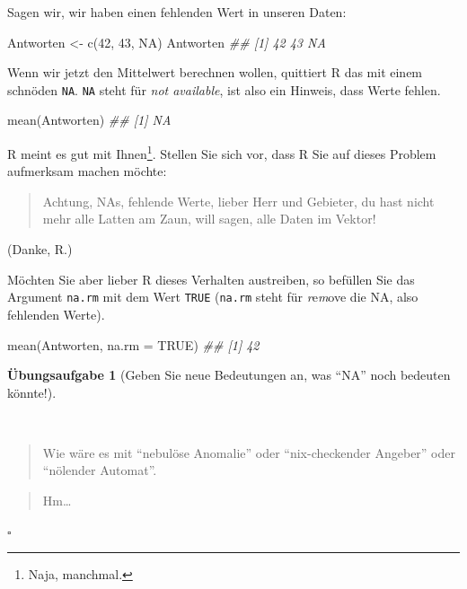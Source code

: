 \documentclass[
  letterpaper,
]{scrbook}
\newenvironment{Shaded}{\begin{snugshade}}{\end{snugshade}}
\newcommand{\AttributeTok}[1]{\textcolor[rgb]{0.40,0.45,0.13}{#1}}
\newcommand{\ConstantTok}[1]{\textcolor[rgb]{0.56,0.35,0.01}{#1}}
\newcommand{\DecValTok}[1]{\textcolor[rgb]{0.68,0.00,0.00}{#1}}
\newcommand{\DocumentationTok}[1]{\textcolor[rgb]{0.37,0.37,0.37}{\textit{#1}}}
\newcommand{\FunctionTok}[1]{\textcolor[rgb]{0.28,0.35,0.67}{#1}}
\newcommand{\NormalTok}[1]{\textcolor[rgb]{0.00,0.23,0.31}{#1}}
\newcommand{\OtherTok}[1]{\textcolor[rgb]{0.00,0.23,0.31}{#1}}
\theoremstyle{definition}
\theoremstyle{definition}
\theoremstyle{definition}
\newtheorem{exercise}{Übungsaufgabe}[chapter]
\theoremstyle{remark}
\begin{document}
Sagen wir, wir haben einen fehlenden Wert in unseren Daten:

\begin{Shaded}
\begin{Highlighting}[]
\NormalTok{Antworten }\OtherTok{\textless{}{-}} \FunctionTok{c}\NormalTok{(}\DecValTok{42}\NormalTok{, }\DecValTok{43}\NormalTok{, }\ConstantTok{NA}\NormalTok{)}
\NormalTok{Antworten}
\DocumentationTok{\#\# [1] 42 43 NA}
\end{Highlighting}
\end{Shaded}

Wenn wir jetzt den Mittelwert berechnen wollen, quittiert R das mit
einem schnöden \texttt{NA}. \texttt{NA} steht für \emph{not available},
ist also ein Hinweis, dass Werte fehlen.

\begin{Shaded}
\begin{Highlighting}[]
\FunctionTok{mean}\NormalTok{(Antworten)}
\DocumentationTok{\#\# [1] NA}
\end{Highlighting}
\end{Shaded}

R meint es gut mit Ihnen\footnote{{} Naja, manchmal.}.
Stellen Sie sich vor, dass R Sie auf dieses Problem aufmerksam machen
möchte:

\begin{quote}
{} Achtung, NAs, fehlende Werte, lieber Herr und Gebieter,
du hast nicht mehr alle Latten am Zaun, will sagen, alle Daten im
Vektor!
\end{quote}

(Danke, R.)

Möchten Sie aber lieber R dieses Verhalten austreiben, so befüllen Sie
das Argument \texttt{na.rm} mit dem Wert \texttt{TRUE} (\texttt{na.rm}
steht für \emph{r}e\emph{m}ove die NA, also fehlenden Werte).

\begin{Shaded}
\begin{Highlighting}[]
\FunctionTok{mean}\NormalTok{(Antworten, }\AttributeTok{na.rm =} \ConstantTok{TRUE}\NormalTok{)}
\DocumentationTok{\#\# [1] 42}
\end{Highlighting}
\end{Shaded}

\begin{exercise}[Geben Sie neue Bedeutungen an, was ``NA'' noch bedeuten
könnte!]\protect\hypertarget{exr-na}{}\label{exr-na}

~

\begin{quote}
{} Wie wäre es mit ``nebulöse Anomalie'' oder
``nix-checkender Angeber'' oder ``nölender Automat''.
\end{quote}

\begin{quote}
{} Hm\ldots{}
\end{quote}

\(\square\)

\end{exercise}
\end{document}
